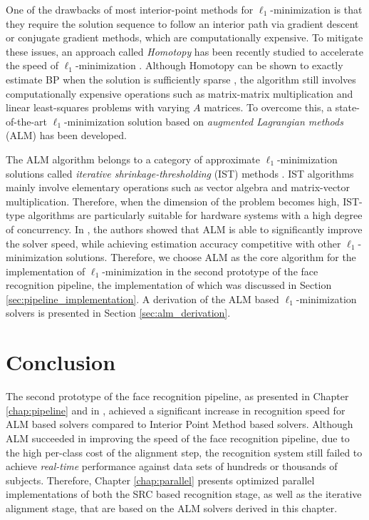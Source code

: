 One of the drawbacks of most interior-point methods for $\ell_1$-minimization
is that they require the solution sequence to follow an interior path via
gradient descent or conjugate gradient methods, which are computationally
expensive.  To mitigate these issues, an approach called \emph{Homotopy} has
been recently studied to accelerate the speed of $\ell_1$-minimization
\cite{OsborneM2000,EfronB2004,MalioutovD2005,DonohoD2006}.  Although Homotopy
can be shown to exactly estimate BP when the solution is sufficiently sparse
\cite{DonohoD2006}, the algorithm still involves computationally expensive
operations such as matrix-matrix multiplication and linear least-squares
problems with varying $A$ matrices.  To overcome this, a state-of-the-art
$\ell_1$-minimization solution based on \emph{augmented Lagrangian methods}
(ALM) \cite{BertsekasD2003,YangA2010-pp} has been developed.

The ALM algorithm belongs to a category of approximate $\ell_1$-minimization
solutions called \emph{iterative shrinkage-thresholding} (IST) methods
\cite{WrightS2008,BeckA2009}.  IST algorithms mainly involve elementary
operations such as vector algebra and matrix-vector multiplication. Therefore,
when the dimension of the problem becomes high, IST-type algorithms are
particularly suitable for hardware systems with a high degree of concurrency.
In \cite{YangA2010-pp}, the authors showed that ALM is able to significantly
improve the solver speed, while achieving estimation accuracy competitive with
other $\ell_1$-minimization solutions. Therefore, we choose ALM as the core
algorithm for the implementation of $\ell_1$-minimization in the second
prototype of the face recognition pipeline, the implementation of which was
discussed in Section \ref{sec:pipeline_implementation}.  A derivation of the
ALM based $\ell_1$-minimization solvers is presented in Section
\ref{sec:alm_derivation}.



%
%
%

\section{Conclusion}
The second prototype of the face recognition pipeline, as presented in Chapter
\ref{chap:pipeline} and in \cite{WagnerA2011-PAMI}, achieved a significant
increase in recognition speed for ALM based solvers compared to Interior Point
Method based solvers.  Although ALM succeeded in improving the speed of the
face recognition pipeline, due to the high per-class cost of the alignment
step, the recognition system still failed to achieve \emph{real-time}
performance against data sets of hundreds or thousands of subjects.  Therefore,
Chapter \ref{chap:parallel} presents optimized parallel implementations of both
the SRC based recognition stage, as well as the iterative alignment stage, that
are based on the ALM solvers derived in this chapter.


